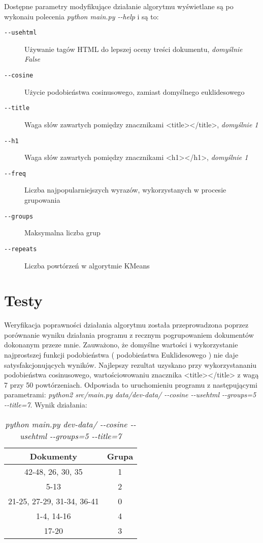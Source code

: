 \documentclass{article}
\begin{document}
Dostępne parametry modyfikujące działanie algorytmu wyświetlane są po wykonaiu polecenia \emph{python main.py -{}-help} i są to:
\begin{description}
\item [\texttt{-{}-usehtml}] Używanie tagów HTML do lepszej oceny treści dokumentu, \emph{domyślnie False}
\item [\texttt{-{}-cosine}] Użycie podobieństwa cosinusowego, zamiast domyślnego euklidesowego
\item [\texttt{-{}-title}] Waga słów zawartych pomiędzy znacznikami <title></title>, \emph{domyślnie 1}
\item [\texttt{-{}-h1}] Waga słów zawartych pomiędzy znacznikami <h1></h1>, \emph{domyślnie 1}
\item [\texttt{-{}-freq}] Liczba najpopularniejszych wyrazów, wykorzystanych w procesie grupowania
\item [\texttt{-{}-groups}] Maksymalna liczba grup
\item [\texttt{-{}-repeats}] Liczba powtórzeń w algorytmie KMeans
\end{description}

\section{Testy}
Weryfikacja poprawności działania algorytmu została przeprowadzona poprzez porównanie wyniku działania programu z recznym pogrupowaniem dokumentów dokonanym przeze mnie. Zauważono, że domyślne wartości i wykorzystanie najprostszej funkcji podobieństwa ( podobieństwa Euklidesowego ) nie daje satysfakcjonujących wyników. Najlepszy rezultat uzyskano przy wykorzystananiu podobieństwa cosinusowego, wartościowowaniu znacznika <title></title> z wagą 7 przy 50 powtórzeniach. Odpowiada to uruchomieniu programu z następującymi parametrami: \emph{python2 src/main.py data/dev-data/ -{}-cosine -{}-usehtml -{}-groups=5  -{}-title=7}. Wynik działania:

\begin{table}[h]
\begin{center}
\begin{tabular}{ | c | c | }
\hline
Dokumenty & Grupa \\ \hline
42-48, 26, 30, 35 & 1 \\ \hline
5-13 & 2 \\ \hline
21-25, 27-29, 31-34, 36-41 & 0 \\ \hline
1-4, 14-16 & 4 \\ \hline
17-20 & 3 \\ \hline
\end{tabular}
\end{center}
\caption{\emph{python main.py dev-data/ -{}-cosine -{}-usehtml -{}-groups=5  -{}-title=7}}
\end{table}
\end{document}
